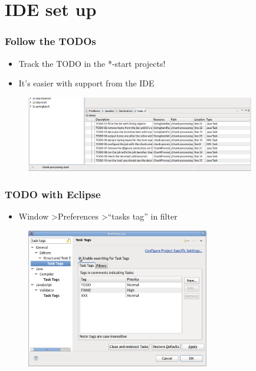 \section{IDE set up}

\begin{frame}
\frametitle{Follow the TODOs}
\begin{itemize}
 \item Track the TODO in the *-start projects!
 \item It's easier with support from the IDE
\end{itemize}

\begin{figure}
\begin{center}
\includegraphics[width=10cm]{figures/tasks.png}
\end{center}
\end{figure}
 
\end{frame}

\begin{frame}
\frametitle{TODO with Eclipse}
\begin{itemize}
 \item Window \textgreater \space Preferences \textgreater \space ``tasks tag'' in filter   
\end{itemize}

\begin{figure}
\begin{center}
\includegraphics[width=8cm]{figures/enable-task-tags.png}
\end{center}
\end{figure}

\end{frame}
 
